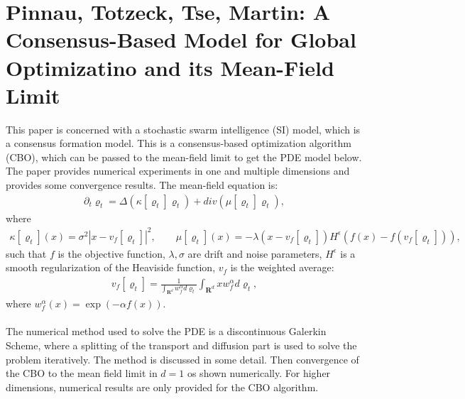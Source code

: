 \documentclass[11pt, a4paper]{article}
\theoremstyle{definition}
\begin{document}
\section{Pinnau, Totzeck, Tse, Martin: A Consensus-Based Model for Global Optimizatino and its Mean-Field Limit \cite{Pinnau_2017}}
This paper is concerned with a stochastic swarm intelligence (SI) model, which is a consensus formation model. This is a consensus-based optimization algorithm (CBO), which can be passed to the mean-field limit to get the PDE model below. The paper provides numerical experiments in one and multiple dimensions and provides some convergence results.
The mean-field equation is:
\begin{align*}
\partial_t \varrho_t = \Delta (\kappa[\varrho_t]\varrho_t) + div (\mu[\varrho_t]\varrho_t),
\end{align*}
where
\begin{align*}
\kappa[\varrho_t](x) = \sigma^2 |x- v_f[\varrho_t]|^2, \qquad \mu[\varrho_t](x) = - \lambda (x- v_f[\varrho_t])H^\epsilon(f(x)-f(v_f[\varrho_t])),
\end{align*}
such that $f$ is the objective function, $\lambda, \sigma$ are drift and noise parameters, $H^\epsilon$ is a smooth regularization of the Heaviside function, $v_f$ is the weighted average:
\begin{align*}
v_f[\varrho_t] = \frac{1}{\int_{\mathbf{R}^{d}}w_f^\alpha d \varrho_t}\int_{\mathbf{R}^{d}}xw_f^\alpha d \varrho_t,
\end{align*}
where $w_f^\alpha(x)=\exp(-\alpha f(x))$.\\
\\
The numerical method used to solve the PDE is a discontinuous Galerkin Scheme, where a splitting of the transport and diffusion part is used to solve the problem iteratively. The method is discussed in some detail. Then convergence of the CBO to the mean field limit in $d=1$ os shown numerically. For higher dimensions, numerical results are only provided for the CBO algorithm.



















\pagebreak	


\end{document}
